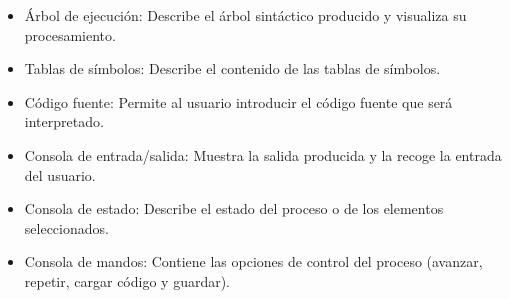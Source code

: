 \begin{itemize}
\item Árbol de ejecución: Describe el árbol sintáctico producido y visualiza su procesamiento.
\item Tablas de símbolos: Describe el contenido de las tablas de símbolos.
\item Código fuente: Permite al usuario introducir el código fuente que será interpretado.
\item Consola de entrada/salida: Muestra la salida producida y la recoge la entrada del usuario.
\item Consola de estado: Describe el estado del proceso o de los elementos seleccionados.
\item Consola de mandos: Contiene las opciones de control del proceso (avanzar, repetir, cargar código y guardar).
\end{itemize}
